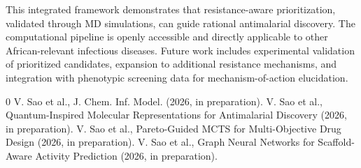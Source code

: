 \documentclass[12pt,a4paper]{article}
\begin{document}
	This integrated framework demonstrates that resistance-aware prioritization, validated through MD simulations, can guide rational antimalarial discovery. The computational pipeline is openly accessible and directly applicable to other African-relevant infectious diseases. Future work includes experimental validation of prioritized candidates, expansion to additional resistance mechanisms, and integration with phenotypic screening data for mechanism-of-action elucidation.
	
	
	\begingroup
	\renewcommand{\section}[2]{}
	\begin{thebibliography}{0}
		\setlength{\parskip}{0mm}
		\setlength{\itemsep}{-0.3mm}
		\small
		 V. Sao et al., J. Chem. Inf. Model. (2026, in preparation).
		 V. Sao et al., Quantum-Inspired Molecular Representations for Antimalarial Discovery (2026, in preparation).
		 V. Sao et al., Pareto-Guided MCTS for Multi-Objective Drug Design (2026, in preparation).
		 V. Sao et al., Graph Neural Networks for Scaffold-Aware Activity Prediction (2026, in preparation).
	\end{thebibliography}
	\endgroup
	
	
\end{document}
